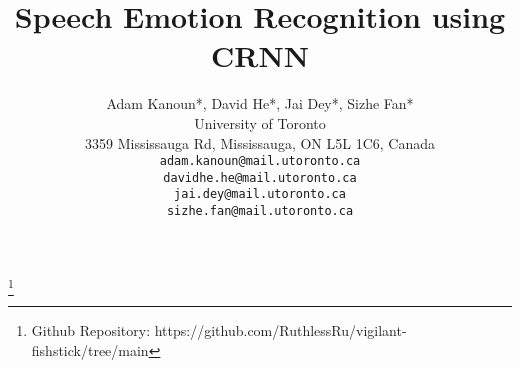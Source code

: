 \documentclass{article}
\title{Speech Emotion Recognition using CRNN}
\author{%
  Adam Kanoun*, David He*, Jai Dey*, Sizhe Fan*
  \\ University of Toronto\\3359 Mississauga Rd, Mississauga, ON L5L 1C6, Canada \\
  \texttt{adam.kanoun@mail.utoronto.ca} \\
  \texttt{davidhe.he@mail.utoronto.ca} \\
  \texttt{jai.dey@mail.utoronto.ca} \\
  \texttt{sizhe.fan@mail.utoronto.ca} \\
}
\begin{document}
\footnote{Github Repository: https://github.com/RuthlessRu/vigilant-fishstick/tree/main}

\maketitle

























\end{document}
